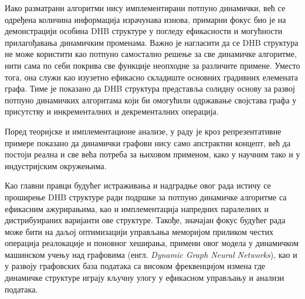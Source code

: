 Иако разматрани алгоритми нису имплементирани потпуно динамички, већ се одређена количина информација израчунава изнова, примарни фокус био је на демонстрацији особина DHB структуре у погледу ефикасности и могућности прилагођавања динамичким променама. Важно је нагласити да се DHB структура не може користити као потпуно самостално решење за све динамичке алгоритме, нити сама по себи покрива све функције неопходне за различите примене. Уместо тога, она служи као изузетно ефикасно складиште основних градивних елемената графа. Тиме је показано да DHB структура представља солидну основу за развој потпуно динамичких алгоритама који би омогућили одржавање својстава графа у присутству и инкременталних и декременталних операција.

Поред теоријске и имплементационе анализе, у раду је кроз репрезентативне примере показано да динамички графови нису само апстрактни концепт, већ да постоји реална и све већа потреба за њиховом применом, како у научним тако и у индустријским окружењима.

Као главни правци будућег истраживања и надградње овог рада истичу се проширење DHB структуре ради подршке за потпуно динамичке алгоритме са ефикасним ажурирањима, као и имплементација напредних паралелних и дистрибуираних варијанти ове структуре. Такође, значајан фокус будућег рада може бити на даљој оптимизацији управљања меморијом приликом честих операција реалокације и поновног хеширања, примени овог модела у динамичком машинском учењу над графовима (енгл. \textit{Dynamic Graph Neural Networks}), као и у развоју графовских база података са високом фреквенцијом измена где динамичке структуре играју кључну улогу у ефикасном управљању и анализи података.

